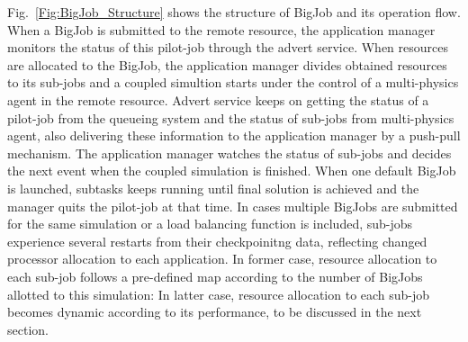 \documentclass[conference,final]{IEEEtran}
\begin{document}
Fig.~\ref{Fig:BigJob_Structure} shows the structure of BigJob and its operation flow. 
When a BigJob is submitted to the remote resource, the application manager monitors the 
status of this pilot-job through the advert service. When resources are allocated to the 
BigJob, the application manager divides obtained resources to its sub-jobs and a coupled 
simultion starts under the control of a multi-physics agent in the remote resource. 
Advert service keeps on getting the status of a pilot-job from the queueing system and 
the status of sub-jobs from multi-physics agent, also delivering these information to the 
application manager by a push-pull mechanism. The application manager watches the status 
of sub-jobs and decides the next event when the coupled simulation is finished. When one 
default BigJob is launched, subtasks keeps running until final solution is achieved and 
the manager quits the pilot-job at that time. In cases multiple BigJobs are submitted for 
the same simulation or a load balancing function is included, sub-jobs experience several 
restarts from their checkpoinitng data, reflecting changed processor allocation to each 
application. In former case, resource allocation to each sub-job follows a pre-defined 
map according to the number of BigJobs allotted to this simulation: In latter case, 
resource allocation to each sub-job becomes dynamic according to its performance, to be 
discussed in the next section.
\end{document}
